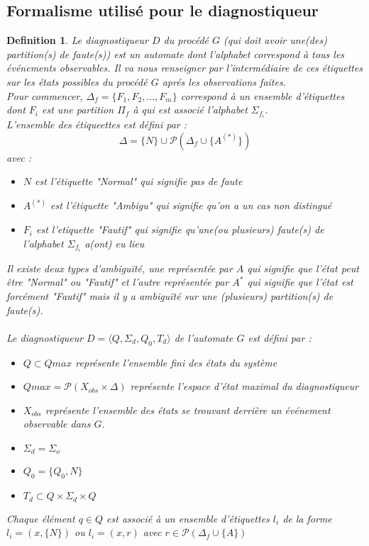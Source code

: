 \documentclass{article}
\newtheorem{mydef}{Definition}
\newcounter{ex}[section]
\begin{document}
\subsection{Formalisme utilis\'e pour le diagnostiqueur}
 \begin{mydef}
Le diagnostiqueur $D$ du proc\'ed\'e $G$ (qui doit avoir une(des) partition(s) de faute(s)) est un automate dont l'alphabet correspond \`a tous les \'ev\'enements observables. Il va nous renseigner par l'interm\'ediaire de ces \'etiquettes sur les \'etats possibles du proc\'ed\'e $G$ apr\'es les observations faites.\\
Pour commencer, $\Delta_f=\{F_1,F_2,\dots, F_m\}$ correspond \`a un ensemble d'\'etiquettes dont $F_i$ est une partition $\Pi_f$ \`a qui est associ\'e l'alphabet $\Sigma_{f_i}$.\\
L'ensemble des \'etiqueettes est d\'efini par : 
\[
\Delta=\{N\} \cup \mathcal{P}(\Delta_f \cup \{A^{(*)}\})
\]
avec : 
\begin{itemize}
\item $N$ est l'\'etiquette "Normal" qui signifie pas de faute
\item $A^{(*)}$ est l'\'etiquette "Ambigu" qui signifie qu'on a un cas non distingu\'e
\item $F_i$ est l'etiquette "Fautif" qui signifie qu'une(ou plusieurs) faute(s) de l'alphabet $\Sigma_{f_i}$ a(ont) eu lieu
\end{itemize}
Il existe deux types d'ambigu\"it\'e, une repr\'esent\'ee par $A$ qui signifie que l'\'etat peut \^etre "Normal" ou "Fautif" et l'autre repr\'esent\'ee par $A^*$ qui signifie que l'\'etat est forc\'ement "Fautif" mais il y a ambigu\"it\'e sur une (plusieurs) partition(s) de faute(s).\\ \\
 Le diagnostiqueur $D=\langle Q, \Sigma_d, Q_0, T_d \rangle$ de l'automate $G$ est d\'efini par :
 \begin{itemize}
 \item $Q \subset Qmax$ repr\'esente l'ensemble fini des \'etats du syst\`eme
 \item $Qmax = \mathcal{P}(X_{obs} \times \Delta)$ repr\'esente l'espace d'\'etat maximal du diagnostiqueur
 \item $X_{obs}$ repr\'esente l'ensemble des \'etats se trouvant derri\`ere un \'ev\'enement observable dans $G$.
 \item $\Sigma_d = \Sigma_o$
 \item $Q_0=\{Q_0,N\}$
 \item $T_d \subset Q \times \Sigma_d \times Q$
 \end{itemize}
 Chaque \'el\'ement $q \in Q$ est associ\'e \`a un ensemble d'\'etiquettes $l_i$ de la forme $l_i=(x,\{N\})$ ou $l_i=(x,r)$ avec $r \in \mathcal{P}( \Delta_f \cup \{A\})$
 \end{mydef}
\end{document}
